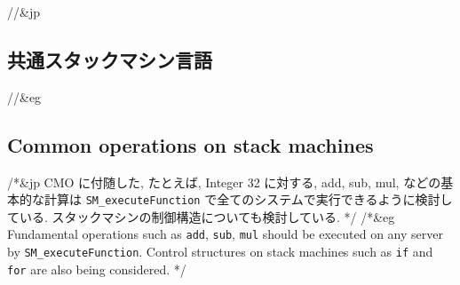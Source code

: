 //&jp \subsection{共通スタックマシン言語}
//&eg \subsection{Common operations on stack machines}

/*&jp
CMO に付随した, たとえば, Integer 32 に対する,
add, sub, mul, などの基本的な計算は {\tt SM\_executeFunction}
で全てのシステムで実行できるように検討している.
スタックマシンの制御構造についても検討している.
*/
/*&eg
Fundamental operations such as {\tt add}, {\tt sub}, {\tt mul} should be
executed on any server by {\tt SM\_executeFunction}.
Control structures on stack machines such as {\tt if} and {\tt for}
are also being considered.
*/

